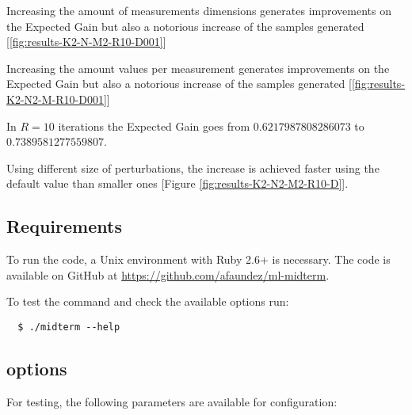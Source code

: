 \documentclass[letterpaper, conference]{IEEEtran}
\begin{document}
Increasing the amount of measurements dimensions generates improvements on the Expected Gain but also a notorious increase of the samples generated [\ref{fig:results-K2-N-M2-R10-D001}]




Increasing the amount values per measurement generates improvements on the Expected Gain but also a notorious increase of the samples generated [\ref{fig:results-K2-N2-M-R10-D001}]




In $R = 10$ iterations the Expected Gain goes from $0.6217987808286073$ to $0.7389581277559807$.

Using different size of perturbations, the increase is achieved faster using the default value than smaller ones [Figure \ref{fig:results-K2-N2-M2-R10-D}].







\subsection{Requirements}

To run the code, a Unix environment with Ruby 2.6+ is necessary. The code is available on GitHub at \url{https://github.com/afaundez/ml-midterm}.

To test the command and check the available options run:

\begin{verbatim}
  $ ./midterm --help
\end{verbatim}

\subsection{options}

For testing, the following parameters are available for configuration:
\end{document}

